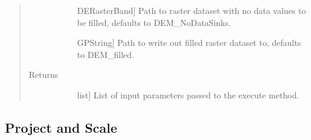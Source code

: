 \documentclass[letterpaper,10pt,english]{sphinxmanual}
\begin{document}
\begin{fulllineitems}
\begin{fulllineitems}
\begin{quote}
\begin{description}
\begin{description}
\item[{}] \leavevmode{[}DERasterBand{]}
Path to raster dataset with no data values to be filled, defaults to DEM\_NoDataSinks.

\item[{}] \leavevmode{[}GPString{]}
Path to write out filled raster dataset to, defaults to DEM\_filled.

\end{description}

\item[{Returns}] \leavevmode\begin{description}
\item[{}] \leavevmode{[}list{]}
List of input parameters passed to the execute method.

\end{description}

\end{description}\end{quote}

\end{fulllineitems}


\end{fulllineitems}



\subsection{Project and Scale}
\label{\detokenize{StreamStats_DataPrep:project-and-scale}}
\end{document}
